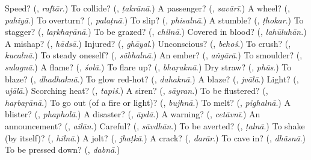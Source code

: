 \begin{tcolorbox}[breakable,colback=teal!4,colframe=teal!35!black,title={Before you move on}]
Speed? (\textbf{}, \emph{raftār}.) To collide? (\textbf{}, \emph{ṭakrānā}.) A passenger? (\textbf{}, \emph{savārī}.) A wheel? (\textbf{}, \emph{pahiyā}.) To overturn? (\textbf{}, \emph{palaṭnā}.) To slip? (\textbf{}, \emph{phisalnā}.) A stumble? (\textbf{}, \emph{ṭhokar}.) To stagger? (\textbf{}, \emph{laṛkhaṛānā}.) To be grazed? (\textbf{}, \emph{chilnā}.) Covered in blood? (\textbf{}, \emph{lahūluhān}.) A mishap? (\textbf{}, \emph{hādsā}.) Injured? (\textbf{}, \emph{ghāyal}.) Unconscious? (\textbf{}, \emph{behoś}.) To crush? (\textbf{}, \emph{kucalnā}.) To steady oneself? (\textbf{}, \emph{sãbhalnā}.) An ember? (\textbf{}, \emph{aṅgārā}.) To smoulder? (\textbf{}, \emph{sulagnā}.) A flame? (\textbf{}, \emph{śolā}.) To flare up? (\textbf{}, \emph{bhaṛaknā}.) Dry straw? (\textbf{}, \emph{phūs}.) To blaze? (\textbf{}, \emph{dhadhaknā}.) To glow red-hot? (\textbf{}, \emph{dahaknā}.) A blaze? (\textbf{}, \emph{jvālā}.) Light? (\textbf{}, \emph{ujālā}.) Scorching heat? (\textbf{}, \emph{tapiś}.) A siren? (\textbf{}, \emph{sāyran}.) To be flustered? (\textbf{}, \emph{haṛbaṛānā}.) To go out (of a fire or light)? (\textbf{}, \emph{bujhnā}.) To melt? (\textbf{}, \emph{pighalnā}.) A blister? (\textbf{}, \emph{phapholā}.) A disaster? (\textbf{}, \emph{āpdā}.) A warning? (\textbf{}, \emph{cetāvnī}.) An announcement? (\textbf{}, \emph{ailān}.) Careful? (\textbf{}, \emph{sāvdhān}.) To be averted? (\textbf{}, \emph{ṭalnā}.) To shake (by itself)? (\textbf{}, \emph{hilnā}.) A jolt? (\textbf{}, \emph{jhaṭkā}.) A crack? (\textbf{}, \emph{darār}.) To cave in? (\textbf{}, \emph{dhãsnā}.) To be pressed down? (\textbf{}, \emph{dabnā}.)
\end{tcolorbox}
